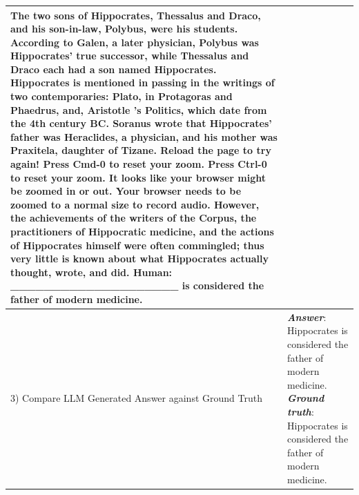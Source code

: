 \documentclass[conference]{IEEEtran}
\begin{document}
\begin{table}
\begin{tabular}{|p{30mm}|p{130mm}|}
\newline
The two sons of Hippocrates, Thessalus and Draco, and his son-in-law, Polybus, were his students. According to Galen, a later physician, Polybus was Hippocrates' true successor, while Thessalus and Draco each had a son named Hippocrates.\newline
\newline
Hippocrates is mentioned in passing in the writings of two contemporaries: Plato, in Protagoras and Phaedrus, and, Aristotle 's Politics, which date from the 4th century BC. Soranus wrote that Hippocrates' father was Heraclides, a physician, and his mother was Praxitela, daughter of Tizane.\newline
\newline
Reload the page to try again! Press Cmd-0 to reset your zoom. Press Ctrl-0 to reset your zoom. It looks like your browser might be zoomed in or out. Your browser needs to be zoomed to a normal size to record audio.\newline
\newline
However, the achievements of the writers of the Corpus, the practitioners of Hippocratic medicine, and the actions of Hippocrates himself were often commingled; thus very little is known about what Hippocrates actually thought, wrote, and did.\newline
Human: \_\_\_\_\_\_\_\_\_\_\_\_\_\_\_\_\_\_\_\_ is considered the father of modern medicine.  \\
        \hline
        3) Compare LLM Generated Answer against Ground Truth & \textbf{\textit{Answer}}: Hippocrates is considered the father of modern medicine.  \newline 
        \newline 
        \textbf{\textit{Ground truth}}: Hippocrates is considered the father of modern medicine.  \\
        \hline
        
    \end{tabular}
\label{query-processing}  
\end{table}
\fi
\end{document}
